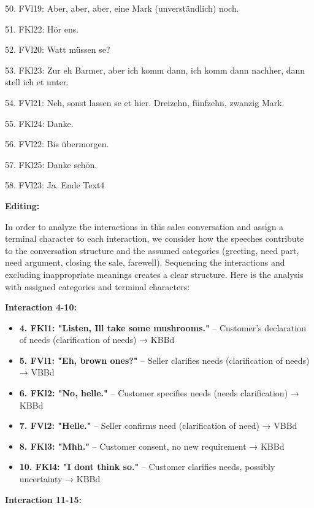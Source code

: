 \documentclass[
]{article}
\begin{document}
50. FVl19: Aber, aber, aber, eine Mark (unverständlich) noch.

51. FKl22: Hör ens.

52. FVl20: Watt müssen se?

53. FKl23: Zur eh Barmer, aber ich komm dann, ich komm dann nachher,
dann stell ich et unter.

54. FVl21: Neh, sonst lassen se et hier. Dreizehn, fünfzehn, zwanzig
Mark.

55. FKl24: Danke.

56. FVl22: Bis übermorgen.

57. FKl25: Danke schön.

58. FVl23: Ja. Ende Text4

\textbf{Editing:}

In order to analyze the interactions in this sales conversation and
assign a terminal character to each interaction, we consider how the
speeches contribute to the conversation structure and the assumed
categories (greeting, need part, need argument, closing the sale,
farewell). Sequencing the interactions and excluding inappropriate
meanings creates a clear structure. Here is the analysis with assigned
categories and terminal characters:

\textbf{Interaction 4-10:}

\begin{itemize}
\item
  \textbf{4. FKl1: "Listen, I\textquotesingle ll take some mushrooms."}
  -- Customer's declaration of needs (clarification of needs) → KBBd
\item
  \textbf{5. FVl1: "Eh, brown ones?"} -- Seller clarifies needs
  (clarification of needs) → VBBd
\item
  \textbf{6. FKl2: "No, helle."} -- Customer specifies needs (needs
  clarification) → KBBd
\item
  \textbf{7. FVl2: "Helle."} -- Seller confirms need (clarification of
  need) → VBBd
\item
  \textbf{8. FKl3: "Mhh."} -- Customer consent, no new requirement →
  KBBd
\item
  \textbf{10. FKl4: "I don\textquotesingle t think so."} -- Customer
  clarifies needs, possibly uncertainty → KBBd
\end{itemize}

\textbf{Interaction 11-15:}
\end{document}
